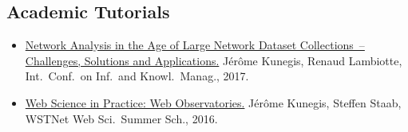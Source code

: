 \documentclass[line,mm]{res}
\newcounter{x}
\newcounter{y}
\newcommand{\talknumber}{T\arabic{y}\stepcounter{y}}
\newcounter{z}
\begin{document}
\begin{resume}
\section{Academic Tutorials}
\begin{itemize}
  \item[{[\talknumber]}]
    \href{http://xn.unamur.be/network-collection-tutorial-cikm2017/}{Network Analysis in the Age of Large Network Dataset Collections~--
    Challenges, Solutions and Applications.}
    Jérôme Kunegis, Renaud Lambiotte, Int.\ Conf.\ on Inf.\ and Knowl.\ Manag., 2017.  
  \item[{[\talknumber]}] 
    \href{http://wwsss16.webscience.org/speakers-and-tutors/dr-jerome-kunegis}{Web Science in Practice:  Web Observatories.}  
    Jérôme Kunegis, Steffen Staab, WSTNet Web Sci.\ Summer Sch., 2016.  
\end{itemize}


\end{resume}
\end{document}
